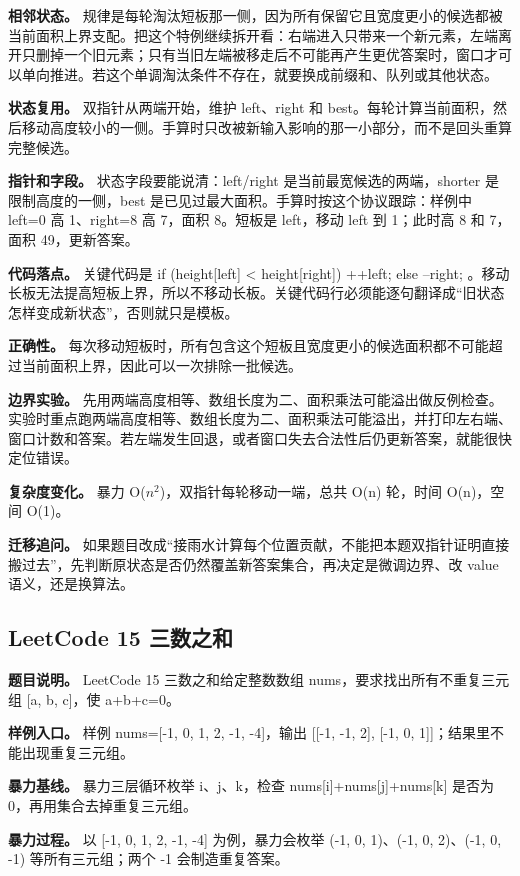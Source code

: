 \textbf{相邻状态。} 规律是每轮淘汰短板那一侧，因为所有保留它且宽度更小的候选都被当前面积上界支配。把这个特例继续拆开看：右端进入只带来一个新元素，左端离开只删掉一个旧元素；只有当旧左端被移走后不可能再产生更优答案时，窗口才可以单向推进。若这个单调淘汰条件不存在，就要换成前缀和、队列或其他状态。

\textbf{状态复用。} 双指针从两端开始，维护 left、right 和 best。每轮计算当前面积，然后移动高度较小的一侧。手算时只改被新输入影响的那一小部分，而不是回头重算完整候选。

\textbf{指针和字段。} 状态字段要能说清：left/right 是当前最宽候选的两端，shorter 是限制高度的一侧，best 是已见过最大面积。手算时按这个协议跟踪：样例中 left=0 高 1、right=8 高 7，面积 8。短板是 left，移动 left 到 1；此时高 8 和 7，面积 49，更新答案。

\textbf{代码落点。} 关键代码是 if (height[left] < height[right]) ++left; else --right; 。移动长板无法提高短板上界，所以不移动长板。关键代码行必须能逐句翻译成“旧状态怎样变成新状态”，否则就只是模板。

\textbf{正确性。} 每次移动短板时，所有包含这个短板且宽度更小的候选面积都不可能超过当前面积上界，因此可以一次排除一批候选。

\textbf{边界实验。} 先用两端高度相等、数组长度为二、面积乘法可能溢出做反例检查。实验时重点跑两端高度相等、数组长度为二、面积乘法可能溢出，并打印左右端、窗口计数和答案。若左端发生回退，或者窗口失去合法性后仍更新答案，就能很快定位错误。

\textbf{复杂度变化。} 暴力 O(\ensuremath{n^{2}})，双指针每轮移动一端，总共 O(n) 轮，时间 O(n)，空间 O(1)。

\textbf{迁移追问。} 如果题目改成“接雨水计算每个位置贡献，不能把本题双指针证明直接搬过去”，先判断原状态是否仍然覆盖新答案集合，再决定是微调边界、改 value 语义，还是换算法。

\subsection{LeetCode 15 三数之和}

\textbf{题目说明。} LeetCode 15 三数之和给定整数数组 nums，要求找出所有不重复三元组 [a, b, c]，使 a+b+c=0。

\textbf{样例入口。} 样例 nums=[-1, 0, 1, 2, -1, -4]，输出 [[-1, -1, 2], [-1, 0, 1]]；结果里不能出现重复三元组。

\textbf{暴力基线。} 暴力三层循环枚举 i、j、k，检查 nums[i]+nums[j]+nums[k] 是否为 0，再用集合去掉重复三元组。

\textbf{暴力过程。} 以 [-1, 0, 1, 2, -1, -4] 为例，暴力会枚举 (-1, 0, 1)、(-1, 0, 2)、(-1, 0, -1) 等所有三元组；两个 -1 会制造重复答案。


